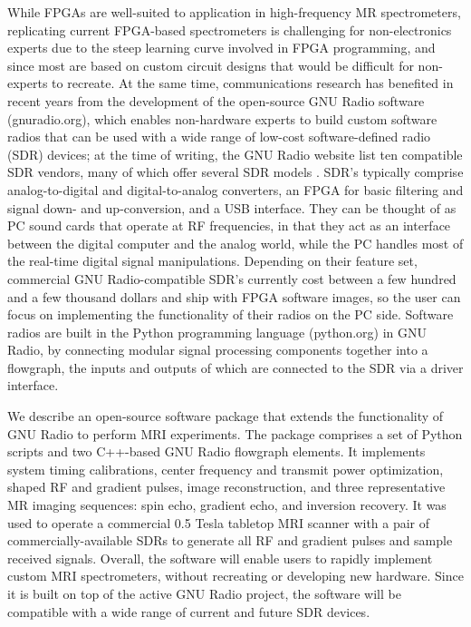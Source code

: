 \documentclass[10pt,letterpaper]{article}
\begin{document}
\par While FPGAs are well-suited to application in high-frequency MR spectrometers, 
replicating current FPGA-based spectrometers is challenging for non-electronics experts
due to the steep learning curve involved in FPGA programming,
and since most are based on custom circuit designs that would be
difficult for non-experts to recreate.
At the same time, communications research has benefited in recent years from the development
of the open-source GNU Radio software (gnuradio.org), 
which enables non-hardware experts to build custom software radios that can be used with a wide range of low-cost 
software-defined radio (SDR) devices; at the time of writing, the GNU Radio website list ten compatible SDR vendors, many of which offer several  SDR models \cite{gnuradiovendors}. 
SDR's typically comprise analog-to-digital and digital-to-analog converters,
an FPGA for basic filtering and signal down- and up-conversion, 
and a USB interface. 
They can be thought of as PC sound cards that operate at RF frequencies, in that
they act as an interface between the digital computer and the analog world, 
while the PC handles most of the real-time digital signal manipulations. 
Depending on their feature set, 
commercial GNU Radio-compatible SDR's currently cost between a few hundred and a few thousand dollars and ship with FPGA software images,
so the user can focus on implementing the functionality of their radios on the PC side.
Software radios are built in the Python programming language (python.org) in GNU Radio, 
by connecting modular signal processing components together
into a flowgraph, the inputs and outputs of which are connected to the SDR via a driver interface. 

\par We describe an open-source software package that extends the functionality of GNU Radio to perform
MRI experiments. 
The package comprises a set of Python scripts and two C++-based GNU Radio flowgraph elements.
It implements system timing calibrations, center frequency and transmit power optimization, 
shaped RF and gradient pulses, image reconstruction, 
and three representative MR imaging sequences: spin echo, gradient echo, and inversion recovery.
It was used to operate a commercial 0.5 Tesla tabletop MRI scanner with a pair of commercially-available SDRs to generate 
all RF and gradient pulses and sample received signals.
Overall, the software will enable users to rapidly implement custom MRI spectrometers, 
without recreating or developing new hardware. 
Since it is built on top of the active GNU Radio project, 
the software will be compatible with a wide range of current and future SDR devices.
\end{document}
